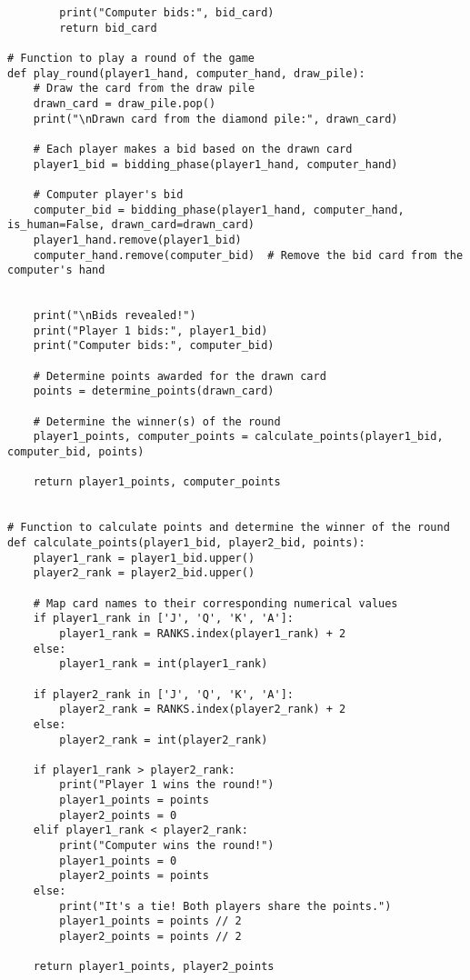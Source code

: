 \documentclass[10pt,onecolumn,letterpaper]{article}
\begin{document}
\begin{lstlisting}
        print("Computer bids:", bid_card)
        return bid_card

# Function to play a round of the game
def play_round(player1_hand, computer_hand, draw_pile):
    # Draw the card from the draw pile
    drawn_card = draw_pile.pop()
    print("\nDrawn card from the diamond pile:", drawn_card)

    # Each player makes a bid based on the drawn card
    player1_bid = bidding_phase(player1_hand, computer_hand)

    # Computer player's bid
    computer_bid = bidding_phase(player1_hand, computer_hand, is_human=False, drawn_card=drawn_card)
    player1_hand.remove(player1_bid)
    computer_hand.remove(computer_bid)  # Remove the bid card from the computer's hand


    print("\nBids revealed!")
    print("Player 1 bids:", player1_bid)
    print("Computer bids:", computer_bid)

    # Determine points awarded for the drawn card
    points = determine_points(drawn_card)

    # Determine the winner(s) of the round
    player1_points, computer_points = calculate_points(player1_bid, computer_bid, points)

    return player1_points, computer_points


# Function to calculate points and determine the winner of the round
def calculate_points(player1_bid, player2_bid, points):
    player1_rank = player1_bid.upper()
    player2_rank = player2_bid.upper()

    # Map card names to their corresponding numerical values
    if player1_rank in ['J', 'Q', 'K', 'A']:
        player1_rank = RANKS.index(player1_rank) + 2
    else:
        player1_rank = int(player1_rank)

    if player2_rank in ['J', 'Q', 'K', 'A']:
        player2_rank = RANKS.index(player2_rank) + 2
    else:
        player2_rank = int(player2_rank)

    if player1_rank > player2_rank:
        print("Player 1 wins the round!")
        player1_points = points
        player2_points = 0
    elif player1_rank < player2_rank:
        print("Computer wins the round!")
        player1_points = 0
        player2_points = points
    else:
        print("It's a tie! Both players share the points.")
        player1_points = points // 2
        player2_points = points // 2

    return player1_points, player2_points


\end{lstlisting}
\end{document}

